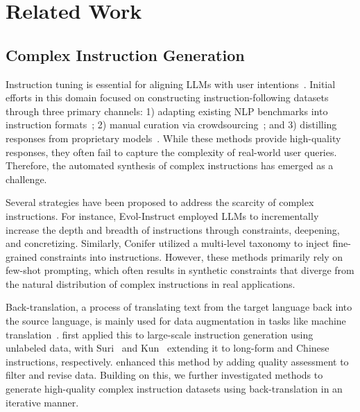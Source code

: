 \section{Related Work}
\subsection{Complex Instruction Generation}


Instruction tuning is essential for aligning LLMs with user intentions~\citep{ouyang2022training,cao2023instruction}. Initial efforts in this domain focused on constructing instruction-following datasets through three primary channels: 1) adapting existing NLP benchmarks into instruction formats~\citep{longpre2023flan,wang2022super}; 2) manual curation via crowdsourcing~\citep{DatabricksBlog2023DollyV2, kopf2023openassistant}; and 3) distilling responses from proprietary models~\citep{alpaca, vicuna2023}. While these methods provide high-quality responses, they often fail to capture the complexity of real-world user queries. Therefore, the automated synthesis of complex instructions has emerged as a challenge.

Several strategies have been proposed to address the scarcity of complex instructions. For instance, Evol-Instruct \citep{xu2023wizardlm} employed LLMs to incrementally increase the depth and breadth of instructions through constraints, deepening, and concretizing. Similarly, Conifer \citep{sun2024conifer} utilized a multi-level taxonomy to inject fine-grained constraints into instructions. However, these methods primarily rely on few-shot prompting, which often results in synthetic constraints that diverge from the natural distribution of complex instructions in real applications.

Back-translation, a process of translating text from the target language back into the source language, is mainly used for data augmentation in tasks like machine translation~\citep{sennrich2015improving, hoang2018iterative}.  \citet{li2023self} first applied this to large-scale instruction generation using unlabeled data, with Suri~\citep{pham2024suri} and Kun~\citep{zheng2024kun} extending it to long-form and Chinese instructions, respectively. \citet{nguyen2024better} enhanced this method by adding quality assessment to filter and revise data. Building on this, we further investigated methods to generate high-quality complex instruction datasets using back-translation in an iterative manner.

